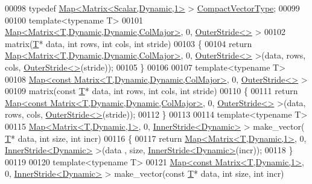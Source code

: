 \begin{DoxyCode}
00098 \textcolor{keyword}{typedef} \hyperlink{group___core___module_class_eigen_1_1_map}{Map<Matrix<Scalar,Dynamic,1>} > 
      \hyperlink{group___core___module_class_eigen_1_1_map}{CompactVectorType};
00099 
00100 \textcolor{keyword}{template}<\textcolor{keyword}{typename} T>
00101 \hyperlink{group___core___module_class_eigen_1_1_map}{Map<Matrix<T,Dynamic,Dynamic,ColMajor>}, 0, 
      \hyperlink{class_eigen_1_1_outer_stride}{OuterStride<>} >
00102 matrix(\hyperlink{group___sparse_core___module}{T}* data, \textcolor{keywordtype}{int} rows, \textcolor{keywordtype}{int} cols, \textcolor{keywordtype}{int} stride)
00103 \{
00104   \textcolor{keywordflow}{return} \hyperlink{group___core___module_class_eigen_1_1_map}{Map<Matrix<T,Dynamic,Dynamic,ColMajor>}, 0, 
      \hyperlink{class_eigen_1_1_outer_stride}{OuterStride<>} >(data, rows, cols, \hyperlink{class_eigen_1_1_outer_stride}{OuterStride<>}(stride));
00105 \}
00106 
00107 \textcolor{keyword}{template}<\textcolor{keyword}{typename} T>
00108 \hyperlink{group___core___module_class_eigen_1_1_map}{Map<const Matrix<T,Dynamic,Dynamic,ColMajor>}, 0, 
      \hyperlink{class_eigen_1_1_outer_stride}{OuterStride<>} >
00109 matrix(\textcolor{keyword}{const} \hyperlink{group___sparse_core___module}{T}* data, \textcolor{keywordtype}{int} rows, \textcolor{keywordtype}{int} cols, \textcolor{keywordtype}{int} stride)
00110 \{
00111   \textcolor{keywordflow}{return} \hyperlink{group___core___module_class_eigen_1_1_map}{Map<const Matrix<T,Dynamic,Dynamic,ColMajor>}, 0, 
      \hyperlink{class_eigen_1_1_outer_stride}{OuterStride<>} >(data, rows, cols, \hyperlink{class_eigen_1_1_outer_stride}{OuterStride<>}(stride));
00112 \}
00113 
00114 \textcolor{keyword}{template}<\textcolor{keyword}{typename} T>
00115 \hyperlink{group___core___module_class_eigen_1_1_map}{Map<Matrix<T,Dynamic,1>}, 0, \hyperlink{class_eigen_1_1_inner_stride}{InnerStride<Dynamic>} > make\_vector(
      \hyperlink{group___sparse_core___module}{T}* data, \textcolor{keywordtype}{int} size, \textcolor{keywordtype}{int} incr)
00116 \{
00117   \textcolor{keywordflow}{return} \hyperlink{group___core___module_class_eigen_1_1_map}{Map<Matrix<T,Dynamic,1>}, 0, \hyperlink{class_eigen_1_1_inner_stride}{InnerStride<Dynamic>} >(data
      , size, \hyperlink{class_eigen_1_1_inner_stride}{InnerStride<Dynamic>}(incr));
00118 \}
00119 
00120 \textcolor{keyword}{template}<\textcolor{keyword}{typename} T>
00121 \hyperlink{group___core___module_class_eigen_1_1_map}{Map<const Matrix<T,Dynamic,1>}, 0, 
      \hyperlink{class_eigen_1_1_inner_stride}{InnerStride<Dynamic>} > make\_vector(\textcolor{keyword}{const} \hyperlink{group___sparse_core___module}{T}* data, \textcolor{keywordtype}{int} size, \textcolor{keywordtype}{int} incr)

\end{DoxyCode}
